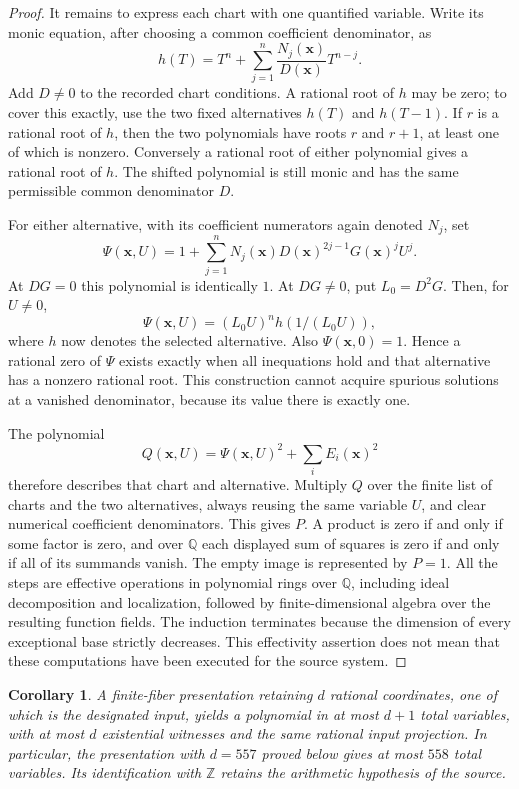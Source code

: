 \documentclass[11pt]{article}
\newtheorem{corollary}[theorem]{Corollary}
\theoremstyle{definition}
\begin{document}
\begin{proof}
It remains to express each chart with one quantified variable. Write its
monic equation, after choosing a common coefficient denominator, as
\[
 h(T)=T^n+\sum_{j=1}^n\frac{N_j(\mathbf x)}{D(\mathbf x)}T^{n-j}.
\]
Add $D\ne0$ to the recorded chart conditions. A rational root of $h$
may be zero; to cover this exactly, use the two fixed alternatives
$h(T)$ and $h(T-1)$. If $r$ is a rational root of $h$, then the two
polynomials have roots $r$ and $r+1$, at least one of which is nonzero.
Conversely a rational root of either polynomial gives a rational root of
$h$. The shifted polynomial is still monic and has the same permissible
common denominator $D$.

For either alternative, with its coefficient numerators again denoted
$N_j$, set
\[
 \Psi(\mathbf x,U)=1+\sum_{j=1}^n
 N_j(\mathbf x)D(\mathbf x)^{2j-1}G(\mathbf x)^jU^j.
\]
At $DG=0$ this polynomial is identically $1$. At $DG\ne0$, put
$L_0=D^2G$. Then, for $U\ne0$,
\[
 \Psi(\mathbf x,U)=(L_0U)^n h(1/(L_0U)),
\]
where $h$ now denotes the selected alternative. Also
$\Psi(\mathbf x,0)=1$. Hence a rational zero of $\Psi$ exists exactly
when all inequations hold and that alternative has a nonzero rational
root. This construction cannot acquire spurious solutions at a vanished
denominator, because its value there is exactly one.

The polynomial
\[
 Q(\mathbf x,U)=\Psi(\mathbf x,U)^2+\sum_iE_i(\mathbf x)^2
\]
therefore describes that chart and alternative. Multiply $Q$ over the
finite list of charts and the two alternatives, always reusing the same
variable $U$, and clear numerical coefficient denominators. This gives
$P$. A product is zero if and only if some factor is zero, and over
$\mathbb Q$ each displayed sum of squares is zero if and only if all of
its summands vanish. The empty image is represented by $P=1$.
All the steps are effective operations in polynomial rings over
$\mathbb Q$, including ideal decomposition and localization, followed by
finite-dimensional algebra over the resulting function fields. The
induction terminates because the dimension of every exceptional base
strictly decreases. This effectivity assertion does not mean that these
computations have been executed for the source system.
\end{proof}

\begin{corollary}
A finite-fiber presentation retaining $d$ rational coordinates, one of
which is the designated input, yields a polynomial in at most $d+1$
total variables, with at most $d$ existential witnesses and the same
rational input projection. In particular, the presentation with $d=557$
proved below gives at most $558$ total variables. Its identification
with $\mathbb Z$ retains the arithmetic hypothesis of the source.
\end{corollary}
\end{document}
